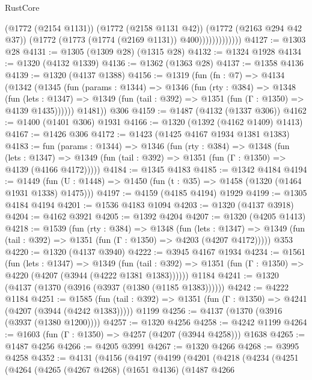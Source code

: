 \begin{lexlean}{RustCore}
\begin{coremodule}
                          (@1772 (@2154 @1131))
                          (@1772 (@2158 @1131 @42))
                          (@1772 (@2163 @294 @42 @37))
                          (@1772 (@1773 (@1774 (@2169 @1131)) @400)))))))))))))
@4127 := @1303 @28
@4131 := @1305 (@1309 @28) (@1315 @28)
@4132 := @1324 @1928
@4134 := @1320 (@4132 @1339)
@4136 := @1362 (@1363 @28)
@4137 := @1358 @4136
@4139 := @1320 (@4137 @1388)
@4156 := @1319
    (fun (fn : @7) =>
    @4134
      (@1342
        (@1345
          (fun (params : @1344) =>
          @1346
            (fun (rty : @384) =>
            @1348
              (fun (lets : @1347) =>
              @1349 (fun (tail : @392) => @1351 (fun (Γ : @1350) => @4139 @1435))))))
        @1481))
    @306
@4159 := @1487 (@4132 (@1337 @306))
@4162 := @1400 (@1401 @306) @1931
@4166 := @1320 (@1392 (@4162 @1409) @1413)
@4167 := @1426 @306
@4172 := @1423 (@1425 @4167 @1934 @1381 @1383)
@4183 := fun (params : @1344) =>
  @1346
    (fun (rty : @384) =>
    @1348
      (fun (lets : @1347) =>
      @1349 (fun (tail : @392) => @1351 (fun (Γ : @1350) => @4139 (@4166 @4172)))))
@4184 := @1345 @4183
@4185 := @1342 @4184
@4194 := @1449 (fun (U : @1448) => @1450 (fun (t : @35) => @1458 (@1320 (@1464 @1931 @1338) @1475)))
@4197 := @4159 (@4185 @4194) @1929
@4199 := @1305 @4184 @4194
@4201 := @1536 @4183 @1094
@4203 := @1320 (@4137 @3918)
@4204 := @4162 @3921
@4205 := @1392 @4204
@4207 := @1320 (@4205 @1413)
@4218 := @1539
    (fun (rty : @384) =>
    @1348
      (fun (lets : @1347) =>
      @1349 (fun (tail : @392) => @1351 (fun (Γ : @1350) => @4203 (@4207 @4172)))))
    @353
@4220 := @1320 (@4137 @3940)
@4222 := @3945 @4167 @1934
@4234 := @1561
    (fun (lets : @1347) =>
    @1349
      (fun (tail : @392) => @1351 (fun (Γ : @1350) => @4220 (@4207 (@3944 (@4222 @1381 @1383))))))
    @1184
@4241 := @1320 (@4137 (@1370 (@3916 (@3937 (@1380 (@1185 @1383))))))
@4242 := @4222 @1184
@4251 := @1585
    (fun (tail : @392) => @1351 (fun (Γ : @1350) => @4241 (@4207 (@3944 (@4242 @1383)))))
    @1199
@4256 := @4137 (@1370 (@3916 (@3937 (@1380 @1200))))
@4257 := @1320 @4256
@4258 := @4242 @1199
@4264 := @1603 (fun (Γ : @1350) => @4257 (@4207 (@3944 @4258))) @1638
@4265 := @1487 @4256
@4266 := @4205 @3991
@4267 := @1320 @4266
@4268 := @3995 @4258
@4352 := @4131
    (@4156
      (@4197
        (@4199
          (@4201
            (@4218
              (@4234
                (@4251
                  (@4264
                    (@4265
                      (@4267 @4268)
                      (@1651 @4136)
                      (@1487
                        @4266

\end{coremodule}
\end{lexlean}
